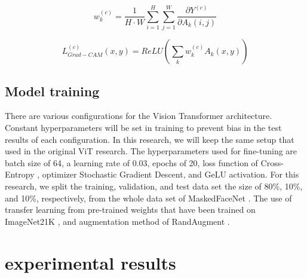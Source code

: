 \documentclass{article}
\begin{document}
\begin{equation}
	w_k^{\left(c\right)}=\frac{1}{H\cdot W}\sum_{i=1}^{H}\sum_{j=1}^{W}\frac{\partial Y^{\left(c\right)}}{\partial A_k\left(i,j\right)}
	\label{pre-Gradcam Equation}
\end{equation}

\begin{equation}
	L_{Grad-CAM}^{\left(c\right)}\left(x,y\right)=ReLU\left(\sum_{k}{w_k^{\left(c\right)}A_k\left(x,y\right)}\right)
	\label{Gradcam Equation}
\end{equation}
\subsection{Model training}\label{model_training}
There are various configurations for the Vision Transformer architecture. Constant hyperparameters will be set in training to prevent bias in the test results of each configuration. In this research, we will keep the same setup that  \cite{Dosovitskiy2020} used in the original ViT research. The hyperparameters used for fine-tuning are batch size of 64, a learning rate of 0.03, epochs of 20, loss function of Cross-Entropy \citep{zhang2018crossentropy}, optimizer Stochastic Gradient Descent, and  GeLU \citep{hendrycks2016gelu} activation. For this research, we split the training, validation, and test data set the size of 80\%, 10\%, and 10\%, respectively, from the whole data set of MaskedFaceNet \citep{Cabani2021}. The use of transfer learning from pre-trained weights that have been trained on ImageNet21K \citep{deng2009imagenet}, and augmentation method of RandAugment \citep{cubuk2019randaugment}.

\section{experimental results}
\end{document}
